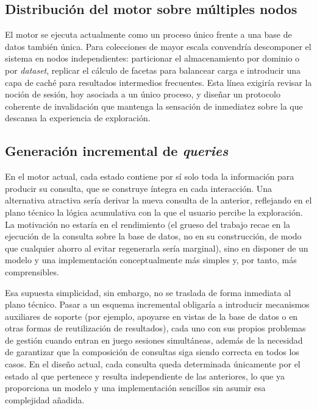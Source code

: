 \subsection{Distribución del motor sobre múltiples nodos}

El motor se ejecuta actualmente como un proceso único frente a una base de datos también única.
Para colecciones de mayor escala convendría descomponer el sistema en nodos independientes:
particionar el almacenamiento por dominio o por \textit{dataset}, replicar el cálculo de facetas para
balancear carga e introducir una capa de caché para resultados intermedios frecuentes. Esta
línea exigiría revisar la noción de sesión, hoy asociada a un único proceso, y diseñar un
protocolo coherente de invalidación que mantenga la sensación de inmediatez sobre la que descansa
la experiencia de exploración.

\subsection{Generación incremental de \textit{queries}}

En el motor actual, cada estado contiene por sí solo toda la información para producir su
consulta, que se construye íntegra en cada interacción. Una alternativa atractiva sería derivar
la nueva consulta de la anterior, reflejando en el plano técnico la lógica acumulativa con la que
el usuario percibe la exploración. La motivación no estaría en el rendimiento (el grueso del
trabajo recae en la ejecución de la consulta sobre la base de datos, no en su construcción, de
modo que cualquier ahorro al evitar regenerarla sería marginal), sino en disponer de un modelo y
una implementación conceptualmente más simples y, por tanto, más comprensibles.

Esa supuesta simplicidad, sin embargo, no se traslada de forma inmediata al plano técnico. Pasar
a un esquema incremental obligaría a introducir mecanismos auxiliares de soporte (por ejemplo,
apoyarse en vistas de la base de datos o en otras formas de reutilización de resultados), cada
uno con sus propios problemas de gestión cuando entran en juego sesiones simultáneas, además de
la necesidad de garantizar que la composición de consultas siga siendo correcta en todos los
casos. En el diseño actual, cada consulta queda determinada únicamente por el estado al que
pertenece y resulta independiente de las anteriores, lo que ya proporciona un modelo y una
implementación sencillos sin asumir esa complejidad añadida.


